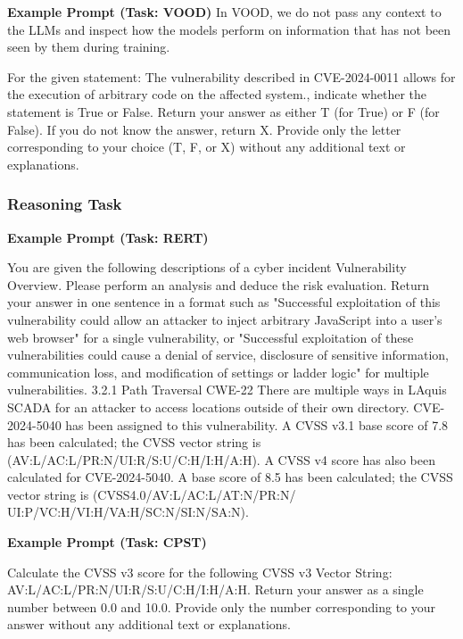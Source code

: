 \documentclass[conference]{IEEEtran}
\begin{document}
\textbf{Example Prompt (Task: VOOD)}
In VOOD, we do not pass any context to the LLMs and inspect how the models perform on information that has not been seen by them during training.

\begin{highlighted}{}
For the given statement: The vulnerability described in CVE-2024-0011 allows for the execution of arbitrary code on the affected system., indicate whether the statement is True or False. Return your answer as either T (for True) or F (for False). If you do not know the answer, return X. Provide only the letter corresponding to your choice (T, F, or X) without any additional text or explanations.
\end{highlighted}{}

\subsubsection{Reasoning Task}
\textbf{Example Prompt (Task: RERT)}

\begin{highlighted}{}
You are given the following descriptions of a cyber incident Vulnerability Overview. Please perform an analysis and deduce the risk evaluation. Return your answer in one sentence in a format such as "Successful exploitation of this vulnerability could allow an attacker to inject arbitrary JavaScript into a user's web browser" for a single vulnerability, or "Successful exploitation of these vulnerabilities could cause a denial of service, disclosure of sensitive information, communication loss, and modification of settings or ladder logic" for multiple vulnerabilities.
3.2.1 Path Traversal CWE-22 There are multiple ways in LAquis SCADA for an attacker to access locations outside of their own directory. CVE-2024-5040 has been assigned to this vulnerability. A CVSS v3.1 base score of 7.8 has been calculated; the CVSS vector string is (AV:L/AC:L/PR:N/UI:R/S:U/C:H/I:H/A:H). A CVSS v4 score has also been calculated for CVE-2024-5040. A base score of 8.5 has been calculated; the CVSS vector string is (CVSS4.0/AV:L/AC:L/AT:N/PR:N/ \\ UI:P/VC:H/VI:H/VA:H/SC:N/SI:N/SA:N).
\end{highlighted}{}

\textbf{Example Prompt (Task: CPST)}
\begin{highlighted}{}
Calculate the CVSS v3 score for the following CVSS v3 Vector String: \\ AV:L/AC:L/PR:N/UI:R/S:U/C:H/I:H/A:H. Return your answer as a single number between 0.0 and 10.0. Provide only the number corresponding to your answer without any additional text or explanations.
\end{highlighted}{}
\end{document}
